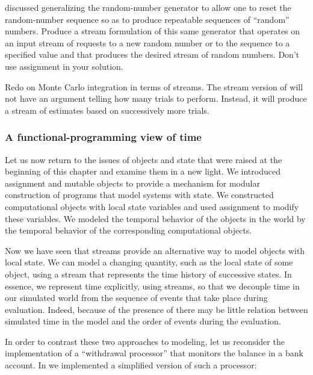 \begin{exerciseGroup}
\label{Exercise 3.81}
  discussed
generalizing the random-number generator to allow one to reset the
random-number sequence so as to produce repeatable sequences of ``random''
numbers.  Produce a stream formulation of this same generator that operates on
an input stream of requests to  a new random number or to
 the sequence to a specified value and that produces the desired
stream of random numbers.  Don't use assignment in your solution.

\label{Exercise 3.82}
 Redo  on Monte
Carlo integration in terms of streams.  The stream version of
 will not have an argument telling how many trials to
perform.  Instead, it will produce a stream of estimates based on successively
more trials.
\end{exerciseGroup}

\subsubsection*{A functional-programming view of time}

Let us now return to the issues of objects and state that were raised at the
beginning of this chapter and examine them in a new light.  We introduced
assignment and mutable objects to provide a mechanism for modular construction
of programs that model systems with state.  We constructed computational
objects with local state variables and used assignment to modify these
variables.  We modeled the temporal behavior of the objects in the world by the
temporal behavior of the corresponding computational objects.

Now we have seen that streams provide an alternative way to model objects with
local state.  We can model a changing quantity, such as the local state of some
object, using a stream that represents the time history of successive states.
In essence, we represent time explicitly, using streams, so that we decouple
time in our simulated world from the sequence of events that take place during
evaluation.  Indeed, because of the presence of  there may be
little relation between simulated time in the model and the order of events
during the evaluation.

In order to contrast these two approaches to modeling, let us reconsider the
implementation of a ``withdrawal processor'' that monitors the balance in a
bank account.  In  we implemented a simplified version of
such a processor:

